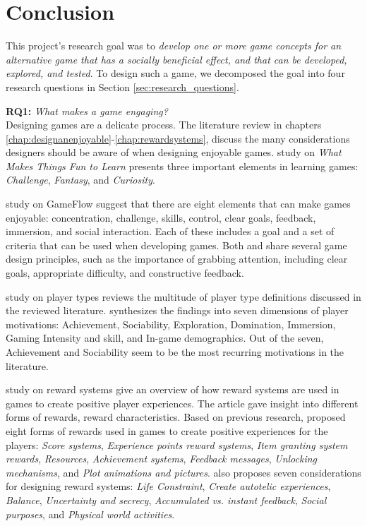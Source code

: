 \documentclass[../Main.tex]{subfiles}
\begin{document}
\section{Conclusion}
\label{chap:conclusion}

This project’s research goal was to \textit{develop one or more game concepts for an alternative game that has a socially beneficial effect, and that can be developed, explored, and tested}. To design such a game, we decomposed the goal into four research questions in Section \ref{sec:research_questions}.

\textbf{RQ1:} \textit{What makes a game engaging?} \\
Designing games are a delicate process. The literature review in chapters \ref{chap:designanenjoyable}-\ref{chap:rewardsystems}, discuss the many considerations designers should be aware of when designing enjoyable games. 
\citet{malone_what_1980} study on \textit{What Makes Things Fun to Learn} presents three important elements in learning games: \textit{Challenge}, \textit{Fantasy}, and \textit{Curiosity}. 

\citet{sweetser_gameflow_2005} study on GameFlow suggest that there are eight elements that can make games enjoyable: concentration, challenge, skills, control, clear goals, feedback, immersion, and social interaction. Each of these includes a goal and a set of criteria that can be used when developing games. Both \citet{malone_what_1980} and \citet{sweetser_gameflow_2005} share several game design principles, such as the importance of grabbing attention, including clear goals, appropriate difficulty, and constructive feedback.

\citet{hamari_player_2014} study on player types reviews the multitude of player type definitions discussed in the reviewed literature. \citeauthor{hamari_player_2014} synthesizes the findings into seven dimensions of player motivations: Achievement, Sociability, Exploration, Domination, Immersion, Gaming Intensity and skill, and In-game demographics. Out of the seven, Achievement and Sociability seem to be the most recurring motivations in the literature. 

\citet{wang_game_2011} study on reward systems give an overview of how reward systems are used in games to create positive player experiences. The article gave insight into different forms of rewards, reward characteristics. Based on previous research, \citeauthor{wang_game_2011} proposed eight forms of rewards used in games to create positive experiences for the players: \textit{Score systems}, \textit{Experience points reward systems}, \textit{Item granting system rewards}, \textit{Resources}, \textit{Achievement systems}, \textit{Feedback messages}, \textit{Unlocking mechanisms}, and \textit{Plot animations and pictures}. \citeauthor{wang_game_2011}  also proposes seven considerations for designing reward systems: \textit{Life Constraint}, \textit{Create autotelic experiences}, \textit{Balance}, \textit{Uncertainty and secrecy}, \textit{Accumulated vs. instant feedback}, \textit{Social purposes}, and \textit{Physical world activities}.
\end{document}
